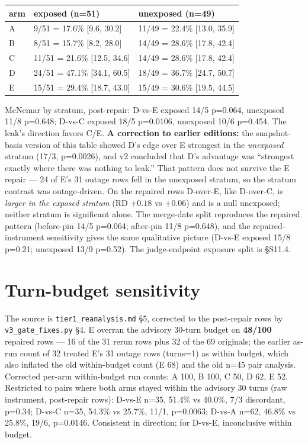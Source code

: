 \documentclass[10pt]{article}
\newcommand{\code}[1]{\texttt{#1}}
\begin{document}
\begin{center}\footnotesize
\begin{tabular}{@{}lll@{}}
\toprule
arm & exposed (n=51) & unexposed (n=49) \\
\midrule
A & 9/51 = 17.6\% [9.6, 30.2] & 11/49 = 22.4\% [13.0, 35.9] \\
B & 8/51 = 15.7\% [8.2, 28.0] & 14/49 = 28.6\% [17.8, 42.4] \\
C & 11/51 = 21.6\% [12.5, 34.6] & 14/49 = 28.6\% [17.8, 42.4] \\
D & 24/51 = 47.1\% [34.1, 60.5] & 18/49 = 36.7\% [24.7, 50.7] \\
E & 15/51 = 29.4\% [18.7, 43.0] & 15/49 = 30.6\% [19.5, 44.5] \\
\bottomrule
\end{tabular}
\end{center}

McNemar by stratum, post-repair: D-vs-E exposed 14/5 p=0.064,
unexposed 11/8 p=0.648; D-vs-C exposed 18/5 p=0.0106, unexposed 10/6
p=0.454. The leak's direction favors C/E. \textbf{A correction to
earlier editions:} the snapshot-basis version of this table showed D's
edge over E strongest in the \emph{unexposed} stratum (17/3,
p=0.0026), and v2 concluded that D's advantage was ``strongest exactly
where there was nothing to leak.'' That pattern does not survive the E
repair --- 24 of E's 31 outage rows fell in the unexposed stratum, so
the stratum contrast was outage-driven. On the repaired rows D-over-E,
like D-over-C, is \emph{larger in the exposed stratum} (RD $+0.18$ vs
$+0.06$) and is a null unexposed; neither stratum is significant
alone. The merge-date split reproduces the repaired pattern
(before-pin 14/5 p=0.064; after-pin 11/8 p=0.648), and the
repaired-instrument sensitivity gives the same qualitative picture
(D-vs-E exposed 15/8 p=0.21; unexposed 13/9 p=0.52). The
judge-endpoint exposure split is \S S11.4.

\section{Turn-budget sensitivity}\label{s5}

The source is \code{tier1\_reanalysis.md} \S 5, corrected to the
post-repair rows by \code{v3\_gate\_fixes.py} \S 4. E overran the
advisory 30-turn budget on \textbf{48/100} repaired rows --- 16 of the
31 rerun rows plus 32 of the 69 originals; the earlier as-run count of
32 treated E's 31 outage rows (turns=1) as within budget, which also
inflated the old within-budget count (E 68) and the old n=45 pair
analysis. Corrected per-arm within-budget run counts: A 100, B 100,
C 50, D 62, E 52. Restricted to pairs where both arms stayed within
the advisory 30 turns (raw instrument, post-repair rows): D-vs-E n=35,
51.4\% vs 40.0\%, 7/3 discordant, p=0.34; D-vs-C n=35, 54.3\% vs
25.7\%, 11/1, p=0.0063; D-vs-A n=62, 46.8\% vs 25.8\%, 19/6,
p=0.0146. Consistent in direction; for D-vs-E, inconclusive within
budget.
\end{document}
